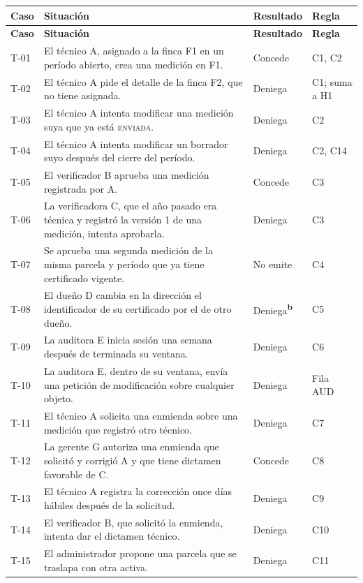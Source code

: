 \documentclass[11pt,letterpaper]{article}
\newcommand{\cab}[1]{\textbf{\rmfamily #1}}
\newcommand{\cnd}[1]{\textsuperscript{\rmfamily\bfseries #1}}   %
\newcommand{\est}[1]{\textsc{\small #1}}
\begin{document}
{\small
\renewcommand{\arraystretch}{1.22}
\begin{longtable}{@{}L{0.9cm} L{9.5cm} L{2.9cm} L{2.2cm}@{}}
\toprule
\cab{Caso} & \cab{Situación} & \cab{Resultado} & \cab{Regla} \\
\midrule
\endfirsthead
\toprule
\cab{Caso} & \cab{Situación} & \cab{Resultado} & \cab{Regla} \\
\midrule
\endhead
\bottomrule
\endfoot
T-01 & El técnico A, asignado a la finca F1 en un período abierto, crea una medición en F1. & Concede & C1, C2 \\
T-02 & El técnico A pide el detalle de la finca F2, que no tiene asignada. & Deniega & C1; suma a H1 \\
T-03 & El técnico A intenta modificar una medición suya que ya está \est{enviada}. & Deniega & C2 \\
T-04 & El técnico A intenta modificar un borrador suyo después del cierre del período. & Deniega & C2, C14 \\
T-05 & El verificador B aprueba una medición registrada por A. & Concede & C3 \\
T-06 & La verificadora C, que el año pasado era técnica y registró la versión 1 de una medición, intenta aprobarla. & Deniega & C3 \\
T-07 & Se aprueba una segunda medición de la misma parcela y período que ya tiene certificado vigente. & No emite & C4 \\
T-08 & El dueño D cambia en la dirección el identificador de su certificado por el de otro dueño. & Deniega\cnd{b} & C5 \\
T-09 & La auditora E inicia sesión una semana después de terminada su ventana. & Deniega & C6 \\
T-10 & La auditora E, dentro de su ventana, envía una petición de modificación sobre cualquier objeto. & Deniega & Fila AUD \\
T-11 & El técnico A solicita una enmienda sobre una medición que registró otro técnico. & Deniega & C7 \\
T-12 & La gerente G autoriza una enmienda que solicitó y corrigió A y que tiene dictamen favorable de C. & Concede & C8 \\
T-13 & El técnico A registra la corrección once días hábiles después de la solicitud. & Deniega & C9 \\
T-14 & El verificador B, que solicitó la enmienda, intenta dar el dictamen técnico. & Deniega & C10 \\
T-15 & El administrador propone una parcela que se traslapa con otra activa. & Deniega & C11 \\

\end{longtable}}
\end{document}
